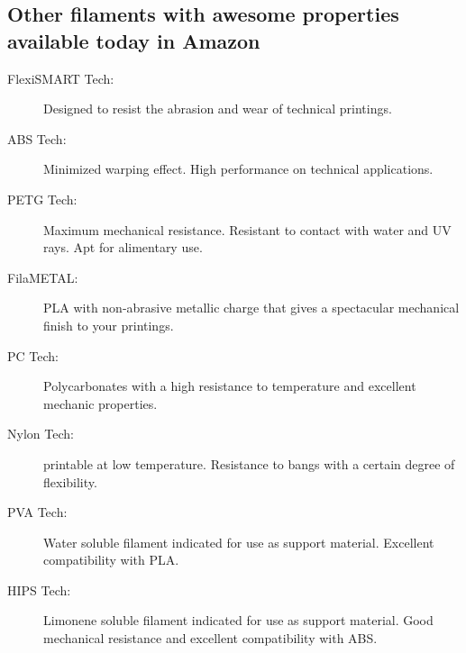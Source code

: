\documentclass[11pt,a4paper]{article}
\begin{document}
\subsection{Other filaments with awesome properties available today in Amazon}
\begin{description}
\item[FlexiSMART Tech:] Designed to resist the abrasion and wear of technical printings.
\item[ABS Tech:] Minimized warping effect. High performance on technical applications.
\item[PETG Tech:] Maximum mechanical resistance. Resistant to contact with water and UV rays. Apt for alimentary use.
\item[FilaMETAL:] PLA with non-abrasive metallic charge that gives a spectacular mechanical finish to your printings.
\item[PC Tech:] Polycarbonates with a high resistance to temperature and excellent mechanic properties.
\item[Nylon Tech:] printable at low temperature. Resistance to bangs with a certain degree of flexibility.
\item[PVA Tech:] Water soluble filament indicated for use as support material. Excellent compatibility with PLA.
\item[HIPS Tech:] Limonene soluble filament indicated for use as support material. Good mechanical resistance and excellent compatibility with ABS.
\end{description}

\end{document}
